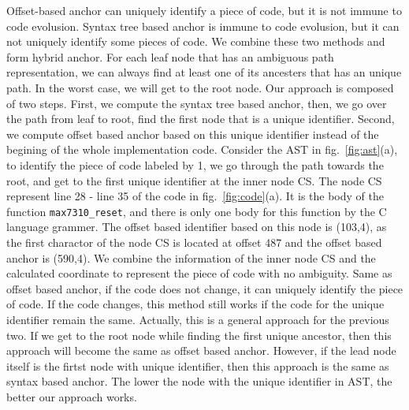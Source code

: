 Offset-based anchor can uniquely identify a piece of code, but it is not immune to code evolusion.
Syntax tree based anchor is immune to code evolusion, but it can not uniquely identify some pieces of code.
We combine these two methods and form hybrid anchor.
For each leaf node that has an ambiguous path representation,
we can always find at least one of its ancesters that has an unique path.
In the worst case, we will get to the root node.
Our approach is composed of two steps.
First, we compute the syntax tree based anchor,
then, we go over the path from leaf to root, find the first node that is a unique identifier.
Second, we compute offset based anchor based on this unique identifier instead of the begining of the whole implementation code.
Consider the AST in fig.~\ref{fig:ast}(a), to identify the piece of code labeled by 1,
we go through the path towards the root,
and get to the first unique identifier at the inner node CS.
The node CS represent line 28 - line 35 of the code in fig.~\ref{fig:code}(a).
It is the body of the function \texttt{max7310\_reset}, and there is only one body for this function by the C language grammer.
The offset based identifier based on this node is (103,4), as the first charactor of the node CS is located at offset 487 and the offset based anchor is (590,4).
We combine the information of the inner node CS and the calculated coordinate to represent the piece of code with no ambiguity.
Same as offset based anchor, if the code does not change, it can uniquely identify the piece of code.
If the code changes, this method still works if the code for the unique identifier remain the same.
Actually, this is a general approach for the previous two.
If we get to the root node while finding the first unique ancestor, then this approach will become the same as offset based anchor.
However, if the lead node itself is the firtst node with unique identifier, then this approach is the same as syntax based anchor.
The lower the node with the unique identifier in AST, the better our approach works.

